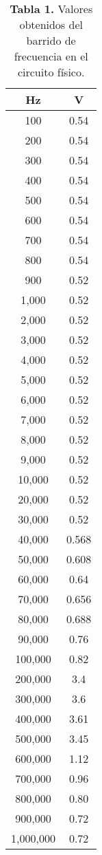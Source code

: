 \documentclass{report}
\begin{document}
	\newpage
	\begin{table}[H]
		\centering
		\begin{tabular}{|c|c|}
			\hline
			\textbf{Hz} & \textbf{V}\\
			\hline
			100 & 0.54\\
			\hline	
			200 & 0.54\\
			\hline
			300 & 0.54\\
			\hline
			400 & 0.54\\
			\hline
			500 & 0.54\\
			\hline
			600 & 0.54\\
			\hline
			700 & 0.54\\
			\hline
			800 & 0.54\\
			\hline
			900 & 0.52\\
			\hline
			1,000 & 0.52\\
			\hline
			2,000 & 0.52\\
			\hline
			3,000 & 0.52\\
			\hline
			4,000 & 0.52\\
			\hline
			5,000 & 0.52\\
			\hline
			6,000 & 0.52\\
			\hline
			7,000 & 0.52\\
			\hline
			8,000 & 0.52\\
			\hline
			9,000 & 0.52\\
			\hline
			10,000 & 0.52\\
			\hline
			20,000 & 0.52\\
			\hline
			30,000 & 0.52\\
			\hline
			40,000 & 0.568\\
			\hline
			50,000 & 0.608\\
			\hline
			60,000 & 0.64\\
			\hline
			70,000 & 0.656\\
			\hline
			80,000 & 0.688\\
			\hline
			90,000 & 0.76\\
			\hline
			100,000 & 0.82\\
			\hline
			200,000 & 3.4\\
			\hline
			300,000 & 3.6\\
			\hline
			400,000 & 3.61\\
			\hline
			500,000 & 3.45\\
			\hline
			600,000 & 1.12\\
			\hline
			700,000 & 0.96\\
			\hline
			800,000 & 0.80\\
			\hline
			900,000 & 0.72\\
			\hline
			1,000,000 & 0.72\\
			\hline
			
		\end{tabular}
		\caption*{\textbf{Tabla 1.} Valores obtenidos del barrido de frecuencia en el circuito físico.}
	\end{table}
\end{document}
